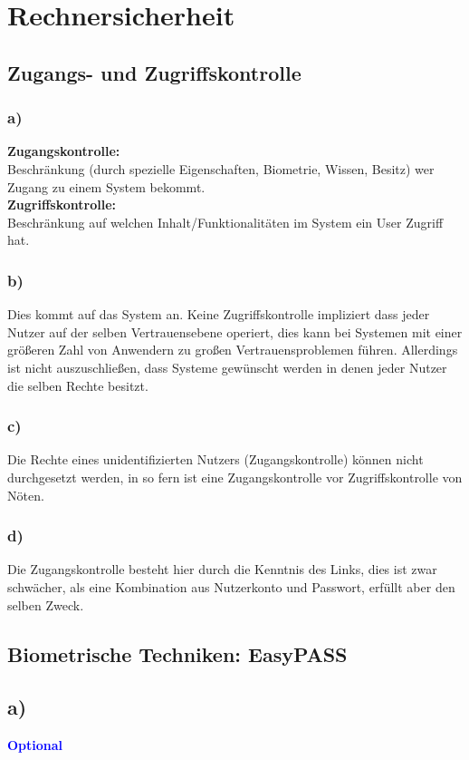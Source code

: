 \documentclass[a4paper,11pt]{scrartcl}
\title{\titleinfo}
\author{\authorinfo}
\newcommand{\opt}{\textcolor{blue}{\textbf{Optional}}}
\begin{document}
\maketitle
\section{\textbf{Rechnersicherheit}}
\subsection{Zugangs- und Zugriffskontrolle}
\subsubsection*{a)} 
\textbf{Zugangskontrolle:} \\
Beschränkung (durch spezielle Eigenschaften, Biometrie, Wissen, Besitz) wer Zugang zu einem System
bekommt. \\
\textbf{Zugriffskontrolle:} \\
Beschränkung auf welchen Inhalt/Funktionalitäten im System ein User Zugriff hat.
\subsubsection*{b)} 
Dies kommt auf das System an. Keine Zugriffskontrolle impliziert dass jeder Nutzer auf der selben Vertrauensebene operiert, dies kann bei Systemen mit einer größeren Zahl von Anwendern zu großen Vertrauensproblemen führen. Allerdings ist nicht auszuschließen, dass Systeme gewünscht werden in denen jeder Nutzer die selben Rechte besitzt.
\subsubsection*{c)} 
Die Rechte eines unidentifizierten Nutzers (Zugangskontrolle) können nicht durchgesetzt werden, in so fern 
ist eine Zugangskontrolle vor Zugriffskontrolle von Nöten.
\subsubsection*{d)} 
Die Zugangskontrolle besteht hier durch die Kenntnis des Links, dies ist zwar schwächer, als eine Kombination aus Nutzerkonto und Passwort, erfüllt aber den selben Zweck. 

\subsection{Biometrische Techniken: EasyPASS}
\subsection*{a)} \opt
\end{document}
